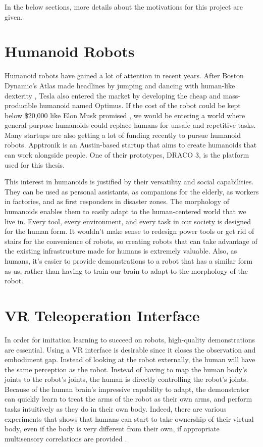 In the below sections, more details about the motivations for this project are given.

\section{Humanoid Robots}
Humanoid robots have gained a lot of attention in recent years. After Boston Dynamic's Atlas made headlines by jumping and dancing with human-like dexterity \cite{atlas}, Tesla also entered the market by developing the cheap and mass-producible humanoid named Optimus. If the cost of the robot could be kept below \$20,000 like Elon Musk promised \cite{teslabot}, we would be entering a world where general purpose humanoids could replace humans for unsafe and repetitive tasks. Many startups are also getting a lot of funding recently to pursue humanoid robots. Apptronik is an Austin-based startup that aims to create humanoids that can work alongside people. One of their prototypes, DRACO 3, is the platform used for this thesis.

This interest in humanoids is justified by their versatility and social capabilities. They can be used as personal assistants, as companions for the elderly, as workers in factories, and as first responders in disaster zones. The morphology of humanoids enables them to easily adapt to the human-centered world that we live in. Every tool, every environment, and every task in our society is designed for the human form. It wouldn't make sense to redesign power tools or get rid of stairs for the convenience of robots, so creating robots that can take advantage of the existing infrastructure made for humans is extremely valuable. Also, as humans, it's easier to provide demonstrations to a robot that has a similar form as us, rather than having to train our brain to adapt to the morphology of the robot.

\section {VR Teleoperation Interface}
In order for imitation learning to succeed on robots, high-quality demonstrations are essential. Using a VR interface is desirable since it closes the observation and embodiment gap. Instead of looking at the robot externally, the human will have the same perception as the robot. Instead of having to map the human body's joints to the robot's joints, the human is directly controlling the robot's joints. Because of the human brain's impressive capability to adapt, the demonstrator can quickly learn to treat the arms of the robot as their own arms, and perform tasks intuitively as they do in their own body. Indeed, there are various experiments that shows that humans can start to take ownership of their virtual body, even if the body is very different from their own, if appropriate multisensory correlations are provided \cite{10.3389/fnhum.2015.00141} \cite{10.3389/neuro.09.006.2008}. 

